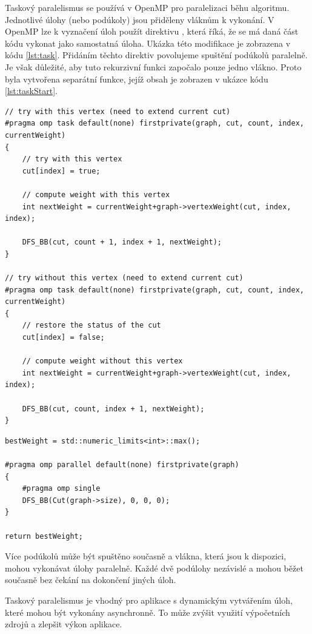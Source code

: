 \documentclass[epsf,epic,eepic,eepicemu]{article}\oddsidemargin=-5mm
\begin{document}
Taskový paralelismus se používá v OpenMP pro paralelizaci běhu algoritmu. Jednotlivé úlohy (nebo podúkoly) jsou přiděleny vláknům k vykonání. V OpenMP lze k vyznačení úloh použít direktivu , která říká, že se má daná část kódu vykonat jako samostatná úloha. Ukázka této modifikace je zobrazena v kódu \ref{lst:task}. Přidáním těchto direktiv povolujeme spuštění podúkolů paralelně. Je však důležité, aby tuto rekurzivní funkci započalo pouze jedno vlákno. Proto byla vytvořena separátní funkce, jejíž obsah je zobrazen v ukázce kódu \ref{lst:taskStart}.

\begin{lstlisting}[float,label=lst:task, caption={Modifikace na taskový paralelismus v rekurzivní funkci}]
// try with this vertex (need to extend current cut)
#pragma omp task default(none) firstprivate(graph, cut, count, index, currentWeight)
{
    // try with this vertex
    cut[index] = true;

    // compute weight with this vertex
    int nextWeight = currentWeight+graph->vertexWeight(cut, index, index);

    DFS_BB(cut, count + 1, index + 1, nextWeight);
}

// try without this vertex (need to extend current cut)
#pragma omp task default(none) firstprivate(graph, cut, count, index, currentWeight)
{
    // restore the status of the cut
    cut[index] = false;

    // compute weight without this vertex
    int nextWeight = currentWeight+graph->vertexWeight(cut, index, index);

    DFS_BB(cut, count, index + 1, nextWeight);
}
\end{lstlisting}

\begin{lstlisting}[float,label=lst:taskStart, caption={Začátek taskového paralelismu}]
bestWeight = std::numeric_limits<int>::max();

#pragma omp parallel default(none) firstprivate(graph)
{
    #pragma omp single
    DFS_BB(Cut(graph->size), 0, 0, 0);
}

return bestWeight;
\end{lstlisting}

Více podúkolů může být spuštěno současně a vlákna, která jsou k dispozici, mohou vykonávat úlohy paralelně. Každé dvě podúlohy nezávislé a mohou běžet současně bez čekání na dokončení jiných úloh.

Taskový paralelismus je vhodný pro aplikace s dynamickým vytvářením úloh, které mohou být vykonány asynchronně. To může zvýšit využití výpočetních zdrojů a zlepšit výkon aplikace.
\end{document}
